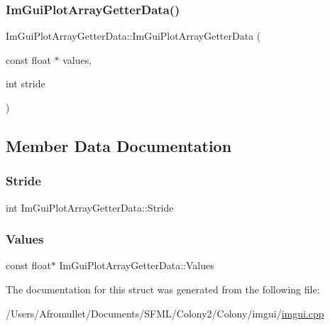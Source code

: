 \subsubsection{\texorpdfstring{Im\+Gui\+Plot\+Array\+Getter\+Data()}{ImGuiPlotArrayGetterData()}}
{\footnotesize\ttfamily Im\+Gui\+Plot\+Array\+Getter\+Data\+::\+Im\+Gui\+Plot\+Array\+Getter\+Data (\begin{DoxyParamCaption}\item[{const float $\ast$}]{values,  }\item[{int}]{stride }\end{DoxyParamCaption})\hspace{0.3cm}{\ttfamily [inline]}}



\subsection{Member Data Documentation}
\mbox{\label{struct_im_gui_plot_array_getter_data_aecb2cce4ea91d95ec81937de656cfcd6}} 
\subsubsection{\texorpdfstring{Stride}{Stride}}
{\footnotesize\ttfamily int Im\+Gui\+Plot\+Array\+Getter\+Data\+::\+Stride}

\mbox{\label{struct_im_gui_plot_array_getter_data_aa40ff2e945549744fc622891089ae0fd}} 
\subsubsection{\texorpdfstring{Values}{Values}}
{\footnotesize\ttfamily const float$\ast$ Im\+Gui\+Plot\+Array\+Getter\+Data\+::\+Values}



The documentation for this struct was generated from the following file\+:\begin{DoxyCompactItemize}
\item 
/\+Users/\+Afromullet/\+Documents/\+S\+F\+M\+L/\+Colony2/\+Colony/imgui/\mbox{\hyperlink{imgui_8cpp}{imgui.\+cpp}}\end{DoxyCompactItemize}
